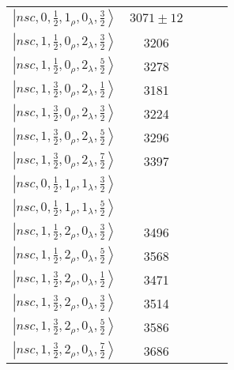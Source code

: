 \documentclass[twocolumn,superscriptaddress,preprintnumbers,nofootinbib]{revtex4}
\begin{document}
\begin{table*}[htbp]
\begin{tabular}{ccccc}
  $\left| nsc,0, \frac{1}{2},1_{\rho},0_{\lambda}, \frac{3}{2} \right\rangle $ & $3071 \pm 12$ &  &  &  \\
 $\left| nsc,1, \frac{1}{2},0_{\rho},2_{\lambda}, \frac{3}{2} \right\rangle  $&3206 & & &  \\
$\left| nsc,1, \frac{1}{2},0_{\rho},2_{\lambda}, \frac{5}{2} \right\rangle  $&3278 & & &  \\
 $\left| nsc,1, \frac{3}{2},0_{\rho},2_{\lambda}, \frac{1}{2} \right\rangle  $&3181 & & &  \\
 $\left| nsc,1, \frac{3}{2},0_{\rho},2_{\lambda}, \frac{3}{2} \right\rangle  $&3224 & & &  \\
 $\left| nsc,1, \frac{3}{2},0_{\rho},2_{\lambda}, \frac{5}{2} \right\rangle  $&3296 & & &  \\
 $\left| nsc,1, \frac{3}{2},0_{\rho},2_{\lambda}, \frac{7}{2} \right\rangle  $&3397 & & &  \\
$\left| nsc,0, \frac{1}{2},1_{\rho},1_{\lambda}, \frac{3}{2} \right\rangle  $&& & &  \\
$\left| nsc,0, \frac{1}{2},1_{\rho},1_{\lambda}, \frac{5}{2} \right\rangle  $&& & &  \\
$\left| nsc,1, \frac{1}{2},2_{\rho},0_{\lambda}, \frac{3}{2} \right\rangle  $&3496 & & &  \\
$\left| nsc,1, \frac{1}{2},2_{\rho},0_{\lambda}, \frac{5}{2} \right\rangle  $& 3568& & &  \\
$\left| nsc,1, \frac{3}{2},2_{\rho},0_{\lambda}, \frac{1}{2} \right\rangle  $&3471 & & &  \\
$\left| nsc,1, \frac{3}{2},2_{\rho},0_{\lambda}, \frac{3}{2} \right\rangle  $&3514 & & &  \\
$\left| nsc,1, \frac{3}{2},2_{\rho},0_{\lambda}, \frac{5}{2} \right\rangle  $&3586 & & &  \\
$\left| nsc,1, \frac{3}{2},2_{\rho},0_{\lambda}, \frac{7}{2} \right\rangle  $&3686 & & &  \\
\hline
\hline
\end{tabular}
\label{tab:widthsXicprime}
\end{table*}
\end{document}
